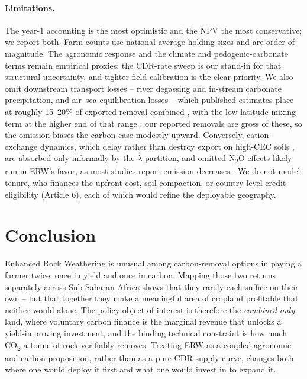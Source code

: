 \documentclass[12pt]{article}
\newcommand{\co}{CO\textsubscript{2}}
\begin{document}
\paragraph{Limitations.} The year-1 accounting is the most optimistic and the
NPV the most conservative; we report both. Farm counts use national average
holding sizes and are order-of-magnitude. The agronomic response and the climate
and pedogenic-carbonate terms remain empirical proxies; the CDR-rate sweep is our
stand-in for that structural uncertainty, and tighter field calibration is the
clear priority. We also omit downstream transport losses -- river degassing and
in-stream carbonate precipitation, and air--sea equilibration losses -- which
published estimates place at roughly 15--20\% of exported removal combined
\citep{renforth2017,zhang2025river}, with the low-latitude mixing term at the
higher end of that range \citep{bertagni2022}; our reported removals are gross
of these, so the omission biases the carbon case modestly upward. Conversely,
cation-exchange dynamics, which delay rather than destroy export on high-CEC
soils \citep{kanzaki2025}, are absorbed only informally by the $\lambda$
partition, and omitted N\textsubscript{2}O effects likely run in ERW's favor,
as most studies report emission decreases \citep{suhrhoff2026esroc,kroeger2026}.
We do not model tenure, who finances the upfront cost, soil compaction, or
country-level credit eligibility (Article 6), each of which would refine the
deployable geography.

\section{Conclusion}\label{sec:conclude}
Enhanced Rock Weathering is unusual among carbon-removal options in paying a
farmer twice: once in yield and once in carbon. Mapping those two returns
separately across Sub-Saharan Africa shows that they rarely each suffice on their
own -- but that together they make a meaningful area of cropland profitable that
neither would alone. The policy object of interest is therefore the
\emph{combined-only} land, where voluntary carbon finance is the marginal
revenue that unlocks a yield-improving investment, and the binding technical
constraint is how much \co{} a tonne of rock verifiably removes. Treating ERW as
a coupled agronomic-and-carbon proposition, rather than as a pure CDR supply
curve, changes both where one would deploy it first and what one would invest in
to expand it.
\end{document}
